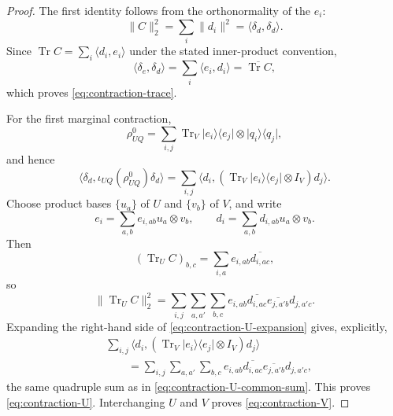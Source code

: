 \documentclass[11pt,reqno]{amsart}
\theoremstyle{remark}
\DeclareMathOperator{\Tr}{Tr}
\newcommand{\ketbra}[2]{\lvert #1\rangle\!\langle #2\rvert}
\newcommand{\ip}[2]{\langle #1,#2\rangle}
\newcommand{\norm}[1]{\lVert #1\rVert}
\begin{document}
\begin{proof}
The first identity follows from the orthonormality of the $e_i$:
\[
    \norm{C}_2^2
    =\sum_i\norm{d_i}^2
    =\ip{\delta_d}{\delta_d}.
\]
Since $\Tr C=\sum_i\ip{d_i}{e_i}$ under the stated inner-product
convention,
\[
    \ip{\delta_e}{\delta_d}
    =\sum_i\ip{e_i}{d_i}
    =\overline{\Tr C},
\]
which proves \cref{eq:contraction-trace}.

For the first marginal contraction,
\[
    \rho^0_{UQ}
    =\sum_{i,j}
      \Tr_V\ketbra{e_i}{e_j}\otimes\ketbra{q_i}{q_j},
\]
and hence
\begin{equation}
\label{eq:contraction-U-expansion}
    \ip{\delta_d}{\iota_{UQ}(\rho^0_{UQ})\delta_d}
    =\sum_{i,j}
      \ip{d_i}{
        (\Tr_V\ketbra{e_i}{e_j}\otimes I_V)d_j
      }.
\end{equation}
Choose product bases $\{u_a\}$ of $U$ and $\{v_b\}$ of $V$, and
write
\[
    e_i=\sum_{a,b}e_{i,ab}u_a\otimes v_b,
    \qquad
    d_i=\sum_{a,b}d_{i,ab}u_a\otimes v_b.
\]
Then
\[
    (\Tr_UC)_{b,c}
    =\sum_{i,a}e_{i,ab}\overline{d_{i,ac}},
\]
so
\begin{equation}
\label{eq:contraction-U-common-sum}
    \norm{\Tr_UC}_2^2
    =\sum_{i,j}\sum_{a,a'}\sum_{b,c}
      e_{i,ab}\overline{d_{i,ac}}
      \overline{e_{j,a'b}}d_{j,a'c}.
\end{equation}
Expanding the right-hand side of
\cref{eq:contraction-U-expansion} gives, explicitly,
\[
\begin{aligned}
    &\sum_{i,j}
      \ip{d_i}{
        (\Tr_V\ketbra{e_i}{e_j}\otimes I_V)d_j
      }\\
    &\qquad=
    \sum_{i,j}\sum_{a,a'}\sum_{b,c}
      e_{i,ab}\overline{d_{i,ac}}
      \overline{e_{j,a'b}}d_{j,a'c},
\end{aligned}
\]
the same quadruple sum as in
\cref{eq:contraction-U-common-sum}.  This proves
\cref{eq:contraction-U}. Interchanging $U$ and $V$ proves
\cref{eq:contraction-V}.
\end{proof}
\end{document}
